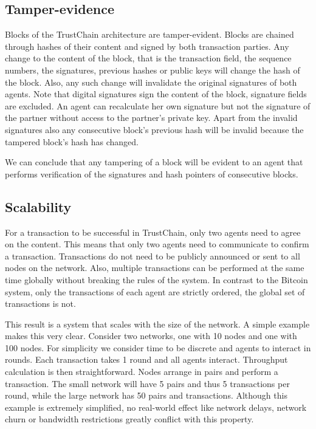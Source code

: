 \subsection{Tamper-evidence}
\label{sec:tamper-proof}
Blocks of the TrustChain architecture are tamper-evident. Blocks are chained through hashes of their
content and signed by both transaction parties. Any change to the content of the block, that is the
transaction field, the sequence numbers, the signatures, previous hashes or public keys will change
the hash of the block. Also, any such change will invalidate the original signatures of both agents.
Note that digital signatures sign the content of the block, signature fields are excluded. An agent
can recalculate her own signature but not the signature of the partner without access to the 
partner's private key. Apart from the invalid signatures also any consecutive block's previous hash
will be invalid because the tampered block's hash has changed.

We can conclude that any tampering of a block will be evident to an agent that performs verification
of the signatures and hash pointers of consecutive blocks.

\subsection{Scalability}
\label{sec:trustchain_scalability}
For a transaction to be successful in TrustChain, only two agents need to agree on the content. This
means that only two agents need to communicate to confirm a transaction. Transactions do not need to 
be publicly announced or sent to all nodes on
the network. Also, multiple transactions can be performed at the same time globally without breaking
the rules of the system. In contrast to the Bitcoin system, only the transactions of each agent are
strictly ordered, the global set of transactions is not.

This result is a system that scales with the size of the network. A simple example makes this very 
clear. Consider two networks, one with 10 nodes and one with 100 nodes. For simplicity we consider
time to be discrete and agents to interact in rounds. Each transaction takes 1 round and all agents 
interact. Throughput calculation is then straightforward. Nodes arrange in pairs and perform a
transaction. The small network will have 5 pairs and thus 5 transactions per round, while the large
network has 50 pairs and transactions. Although this example is extremely simplified, no real-world
effect like network delays, network churn or bandwidth restrictions greatly conflict with this property.

